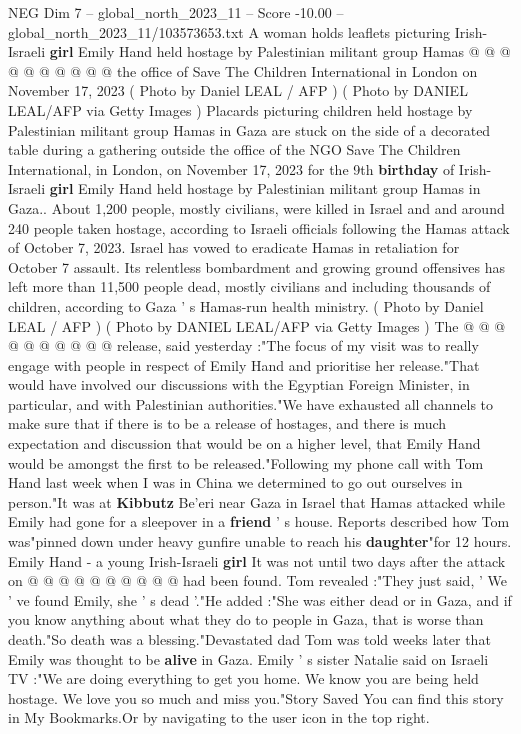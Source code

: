 \begin{textsample}{NEG Dim 7 – global\_north\_2023\_11 – Score -10.00 – global\_north\_2023\_11/103573653.txt}
A woman holds leaflets picturing Irish-Israeli \textbf{girl} Emily Hand held hostage by Palestinian militant group Hamas @ @ @ @ @ @ @ @ @ @ the office of Save The Children International in London on November 17, 2023 ( Photo by Daniel LEAL / AFP ) ( Photo by DANIEL LEAL/AFP via Getty Images ) Placards picturing children held hostage by Palestinian militant group Hamas in Gaza are stuck on the side of a decorated table during a gathering outside the office of the NGO Save The Children International, in London, on November 17, 2023 for the 9th \textbf{birthday} of Irish-Israeli \textbf{girl} Emily Hand held hostage by Palestinian militant group Hamas in Gaza..
About 1,200 people, mostly civilians, were killed in Israel and and around 240 people taken hostage, according to Israeli officials following the Hamas attack of October 7, 2023.
Israel has vowed to eradicate Hamas in retaliation for October 7 assault.
Its relentless bombardment and growing ground offensives has left more than 11,500 people dead, mostly civilians and including thousands of children, according to Gaza ' s Hamas-run health ministry. ( Photo by Daniel LEAL / AFP ) ( Photo by DANIEL LEAL/AFP via Getty Images ) The @ @ @ @ @ @ @ @ @ @ release, said yesterday :"The focus of my visit was to really engage with people in respect of Emily Hand and prioritise her release."That would have involved our discussions with the Egyptian Foreign Minister, in particular, and with Palestinian authorities."We have exhausted all channels to make sure that if there is to be a release of hostages, and there is much expectation and discussion that would be on a higher level, that Emily Hand would be amongst the first to be released."Following my phone call with Tom Hand last week when I was in China we determined to go out ourselves in person."It was at \textbf{Kibbutz} Be'eri near Gaza in Israel that Hamas attacked while Emily had gone for a sleepover in a \textbf{friend} ' s house.
Reports described how Tom was"pinned down under heavy gunfire unable to reach his \textbf{daughter}"for 12 hours.
Emily Hand - a young Irish-Israeli \textbf{girl} It was not until two days after the attack on @ @ @ @ @ @ @ @ @ @ had been found.
Tom revealed :"They just said, ' We ' ve found Emily, she ' s dead '."He added :"She was either dead or in Gaza, and if you know anything about what they do to people in Gaza, that is worse than death."So death was a blessing."Devastated dad Tom was told weeks later that Emily was thought to be \textbf{alive} in Gaza.
Emily ' s sister Natalie said on Israeli TV :"We are doing everything to get you home.
We know you are being held hostage.
We love you so much and miss you."Story Saved You can find this story in My Bookmarks.Or by navigating to the user icon in the top right.

\end{textsample}
